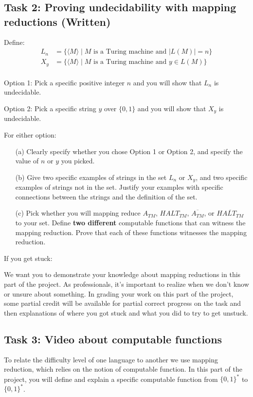 \documentclass[12pt, oneside]{article}
\begin{document}
\subsection*{Task 2: Proving undecidability with mapping reductions (Written)}

	Define:
	\begin{align*}
		L_n &= \{ \langle M \rangle \mid \textrm{$M$ is a Turing machine and } |L(M)| = n\} \\
		X_{y} & = \{ \langle M \rangle \mid \textrm{$M$ is a Turing machine and } y \in L(M)\} \\
	\end{align*}

	Option 1: Pick a specific positive integer $n$ and you will show that $L_n$ is undecidable.

	Option 2: Pick a specific string $y$ over $\{0,1\}$ and you will show that $X_y$ is undecidable.

	For either option:
	\begin{enumerate}
		\item[(a)] Clearly specify whether you chose Option 1 or Option 2, and specify the value of $n$ or $y$ you picked.
		\item[(b)] Give two specific examples of strings in the set $L_n$ or $X_y$, and two specific examples 
		of strings not in the set. Justify your examples with specific connections between the strings and the 
		definition of the set.
		\item[(c)] Pick whether you will mapping reduce $A_{TM}$, $HALT_{TM}$, $\overline{A_{TM}}$, or $\overline{HALT_{TM}}$
		to your set. Define {\bf two different} computable functions that can witness the mapping reduction.
		Prove that each of these functions witnesses the mapping reduction.
	\end{enumerate}

	If you get stuck:

	We want you to demonstrate your knowledge about mapping reductions in this part of the project.  
	As professionals, it's important to realize when we don't know or unsure about something.
	In grading your work on this part of the project, some partial credit will be available for 
	partial correct progress on the task and then explanations of where
	you got stuck and what you did to try to get unstuck.

		
\subsection*{Task 3: Video about computable functions}
To relate the difficulty level of one language to another we use mapping reduction, which relies
on the notion of computable function. In this part of the project, you will define and explain a specific 
computable function from $\{0,1\}^*$ to $\{0,1\}^*$.
\end{document}
